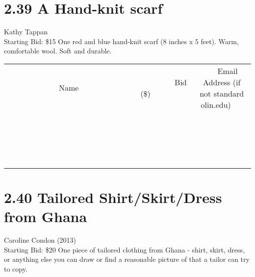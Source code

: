 \documentclass[11pt]{article}
\begin{document}
\section*{2.39 A Hand-knit scarf}
Kathy Tappan
\\
Starting Bid: \$15
\newline
One red and blue hand-knit scarf (8 inches x 5 feet). Warm, comfortable wool. Soft and durable.
\\[3ex]
\begin{tabular}{c c c}
~~~~~~~~~~~~~Name~~~~~~~~~~~~~ & ~~~~~~~~~Bid (\$)~~~~~~~~~  & ~~~Email Address (if not standard olin.edu)~~~\\
 & & \\
\hline
 & & \\
\hline
 & & \\
\hline
 & & \\
\hline
 & & \\
\hline
 & & \\
\hline
 & & \\
\hline
 & & \\
\hline
 & & \\
\hline
 & & \\
\hline
 & & \\
\hline
 & & \\
\hline
 & & \\
\hline
 & & \\
\hline
 & & \\
\hline
 & & \\
\hline
 & & \\
\hline
 & & \\
\hline
 & & \\
\hline
\end{tabular}
\newpage
\section*{2.40 Tailored Shirt/Skirt/Dress from Ghana}
Caroline Condon (2013)
\\
Starting Bid: \$20
\newline
One piece of tailored clothing from Ghana - shirt, skirt, dress, or anything else you can draw or find a reasonable picture of that a tailor can try to copy. 
\end{document}
